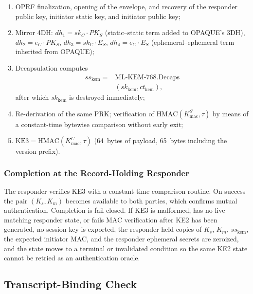 \documentclass{ieeeijc}
\theoremstyle{remark}
\begin{document}
\begin{enumerate}
  \item OPRF finalization, opening of the envelope, and recovery of the
        responder public key, initiator static key, and initiator public
        key;
  \item Mirror 4DH:
        $dh_1 = sk_C \cdot PK_S$ (static--static term added to OPAQUE's 3DH),
        $dh_2 = e_C \cdot PK_S$, $dh_3 = sk_C \cdot E_S$,
        $dh_4 = e_C \cdot E_S$ (ephemeral--ephemeral term inherited from
        OPAQUE);
  \item Decapsulation computes
        \[
          \begin{aligned}
            ss_{\mathrm{kem}} ={}&
            \mathrm{ML\text{-}KEM\text{-}768.Decaps}\\
            & (sk_{\mathrm{kem}}, ct_{\mathrm{kem}}),
          \end{aligned}
        \]
        after which $sk_{\mathrm{kem}}$ is destroyed immediately;
  \item Re-derivation of the same PRK; verification of
        $\mathrm{HMAC}(K_{\mathrm{mac}}^S, \tau)$ by means of a
        constant-time bytewise comparison without early exit;
  \item $\mathrm{KE3} = \mathrm{HMAC}(K_{\mathrm{mac}}^C, \tau)$
        (64~bytes of payload, 65~bytes including the version prefix).
\end{enumerate}

\subsubsection{Completion at the Record-Holding Responder}

The responder verifies KE3 with a constant-time comparison routine. On success the pair $(K_s, K_m)$ becomes available to both parties, which confirms mutual authentication. Completion is fail-closed. If KE3 is malformed, has no live matching responder state, or fails MAC verification after KE2 has been generated, no session key is exported, the responder-held copies of $K_s$, $K_m$, $ss_{\mathrm{kem}}$, the expected initiator MAC, and the responder ephemeral secrets are zeroized, and the state moves to a terminal or invalidated condition so the same KE2 state cannot be retried as an authentication oracle.

\subsection{Transcript-Binding Check}
\end{document}

